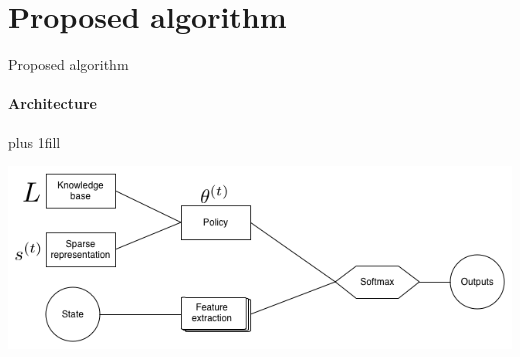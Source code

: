 \documentclass{beamer}
\begin{document}
\section{Proposed algorithm}
\begin{frame}[fragile]{Proposed algorithm}
\framesubtitle{Architecture}
\vskip0pt plus 1fill
\begin{center}
    \includegraphics[width=\linewidth]{knowledge_transfer.png}
\end{center}
\end{frame}
\end{document}
